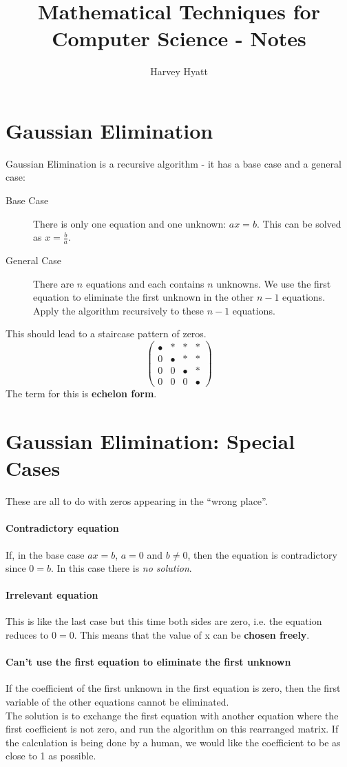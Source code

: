 \documentclass{article}
\title{Mathematical Techniques for Computer Science - Notes}
\author{Harvey Hyatt}
\date{}
\begin{document}
\maketitle

\section{Gaussian Elimination}
Gaussian Elimination is a recursive algorithm - it has a base case and a general case:
\begin{description}
\item[Base Case]
There is only one equation and one unknown: $ax=b$. This can be solved as $x=\frac{b}{a}$.
\item [General Case]
There are $n$ equations and each contains $n$ unknowns. We use the first equation to eliminate the first unknown in the other $n-1$ equations. Apply the algorithm recursively to these $n-1$ equations.
\end{description}
This should lead to a staircase pattern of zeros.
$$\begin{pmatrix}
\bullet & * & * & * \\
0 & \bullet & * & * \\
0 & 0 & \bullet & * \\
0 & 0 & 0 & \bullet
\end{pmatrix}$$
The term for this is \textbf{echelon form}.

\section{Gaussian Elimination: Special Cases}
These are all to do with zeros appearing in the ``wrong place''.
\paragraph{Contradictory equation}
If, in the base case $ax=b$, $a=0$ and $b\neq 0$, then the equation is contradictory since $0=b$. In this case there is \textit{no solution}.

\paragraph{Irrelevant equation}
This is like the last case but this time both sides are zero, i.e. the equation reduces to $0=0$. This means that the value of x can be \textbf{chosen freely}.

\paragraph{Can't use the first equation to eliminate the first unknown}
If the coefficient of the first unknown in the first equation is zero, then the first variable of the other equations cannot be eliminated.
\vspace{1mm}\\
The solution is to exchange the first equation with another equation where the first coefficient is not zero, and run the algorithm on this rearranged matrix. If the calculation is being done by a human, we would like the coefficient to be as close to 1 as possible.
\end{document}
